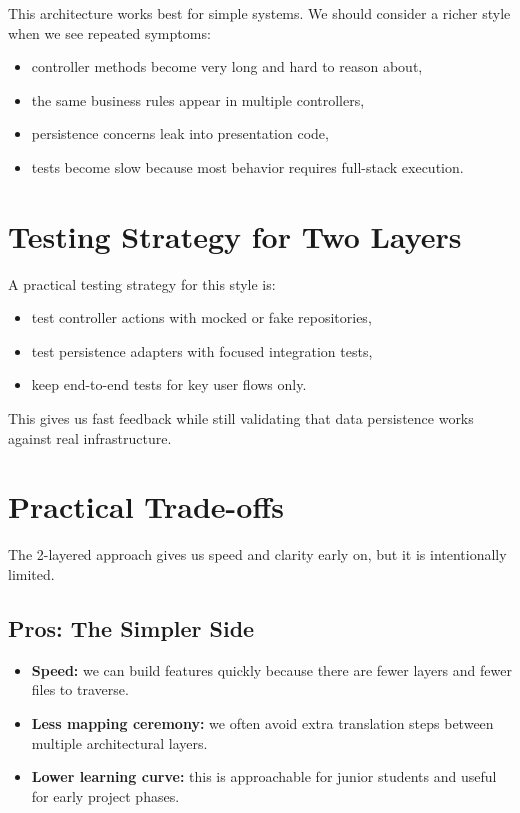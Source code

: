 This architecture works best for simple systems. We should consider a richer style when we see repeated symptoms:
\begin{itemize}
    \item controller methods become very long and hard to reason about,
    \item the same business rules appear in multiple controllers,
    \item persistence concerns leak into presentation code,
    \item tests become slow because most behavior requires full-stack execution.
\end{itemize}

\section{Testing Strategy for Two Layers}
\label{sec:2_layered_testing}

A practical testing strategy for this style is:
\begin{itemize}
    \item test controller actions with mocked or fake repositories,
    \item test persistence adapters with focused integration tests,
    \item keep end-to-end tests for key user flows only.
\end{itemize}

This gives us fast feedback while still validating that data persistence works against real infrastructure.

\section{Practical Trade-offs}
\label{sec:2_layered_tradeoffs}

The 2-layered approach gives us speed and clarity early on, but it is intentionally limited.\autocite{fowler2002patterns}

\subsection{Pros: The Simpler Side}
\label{sec:2_layered_pros}

\begin{itemize}
    \item \textbf{Speed:} we can build features quickly because there are fewer layers and fewer files to traverse.
    \item \textbf{Less mapping ceremony:} we often avoid extra translation steps between multiple architectural layers.
    \item \textbf{Lower learning curve:} this is approachable for junior students and useful for early project phases.
\end{itemize}

